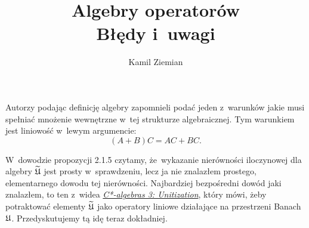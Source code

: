 \documentclass[a4paper,11pt]{article}
\title{Algebry operatorów \\
  {\Large Błędy i~uwagi}}
\author{Kamil Ziemian}
\begin{document}





\maketitle %






\vspace{0em}



\vspace{0em}


\noindent
{} Autorzy podając definicję algebry zapomnieli podać jeden z~warunków
jakie musi spełniać mnożenie wewnętrzne w~tej strukturze algebraicznej. Tym
warunkiem jest liniowość w~lewym argumencie:
\begin{equation}
  \label{eq:Bratteli-Robinson-Operator-Algebras-ETC-Vol-I-s01-01}
  ( A + B ) C = A C + B C.
\end{equation}

\vspace{\VerSpaceFour}




\noindent
{} W~dowodzie propozycji 2.1.5 czytamy, że~wykazanie nierówności
iloczynowej dla algebry $\widetilde{\mathfrak{U}}$ jest prosty w~sprawdzeniu, lecz ja nie
znalazłem prostego, elementarnego dowodu tej nierówności. Najbardziej
bezpośredni dowód jaki znalazłem, to ten z~widea
\href{https://www.youtube.com/watch?v=6NC0UWjDcBQ}{\textit{C*-algebras 3: Unitization}}, który mówi, żeby
potraktować elementy $\widetilde{\mathfrak{U}}$ jako operatory liniowe działające
na przestrzeni Banach $\mathfrak{U}$. Przedyskutujemy tą idę teraz dokładniej.
\end{document}

